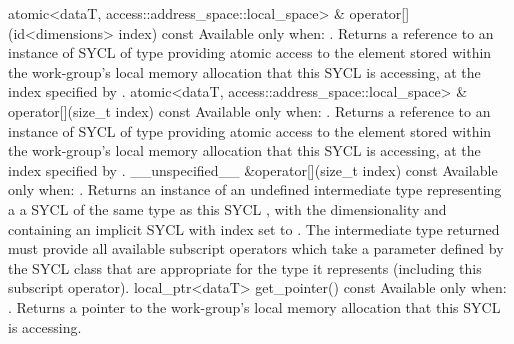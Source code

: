   \addRowTwoL
    { atomic<dataT, access::address_space::local_space> \& }
    { operator[](id<dimensions> index) const }
    {
      Available only when: .
      \newline
      Returns a reference to an instance of SYCL  of type
       providing atomic access to the element stored within
      the work-group's local memory allocation that this SYCL 
      is accessing, at the index specified by .
    }
  \addRowTwoL
    { atomic<dataT, access::address_space::local_space> \& }
    { operator[](size_t index) const }
    {
      Available only when: .
      \newline
      Returns a reference to an instance of SYCL  of type
       providing atomic access to the element stored within
      the work-group's local memory allocation that this SYCL 
      is accessing, at the index specified by .
    }
  \addRow
    { \__unspecified__ \&operator[](size_t index) const }
    {
      Available only when: .
      \newline
      Returns an instance of an undefined intermediate type representing a
      a SYCL  of the same type as this SYCL , with the dimensionality  and
      containing an implicit SYCL  with index  set to . The intermediate type returned
      must provide all available subscript operators which take a  parameter defined by the SYCL  class that
      are appropriate for the type it represents (including this subscript
      operator).
    }
  \addRow
    { local_ptr<dataT> get_pointer() const}
    {
      Available only when: .
      Returns a pointer to the work-group's local memory allocation that this
      SYCL  is accessing.
    }
\completeTable


